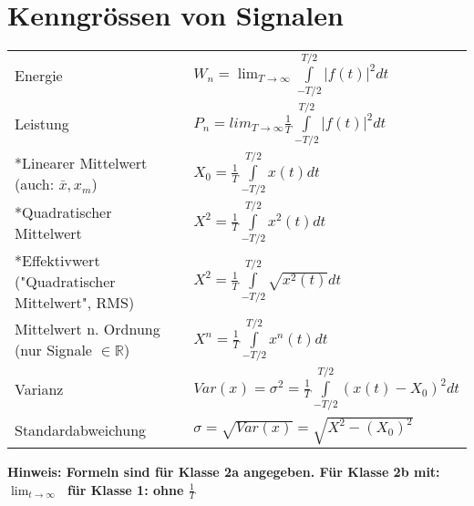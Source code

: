\section{Kenngrössen von Signalen}
\begin{tabular}{p{6cm}p{12cm}}
  Energie                                                            &
  $W_n = \lim_{T \to \infty}  \int \limits _{-T/2} ^{T/2} |f(t)|^2 dt$            \\
  Leistung                                                           &
  $P_n = lim_{T \to \infty} \frac{1}{T} \int \limits _{-T/2} ^{T/2} |f(t)|^2 dt$  \\
  *Linearer Mittelwert
  \newline \tiny(auch: $ \bar{x}, x_m$)                              &
  $X_0 = \frac{1}{T} \int \limits _{-T/2}^{T/2} x(t) dt $                         \\
  *Quadratischer Mittelwert                                          &
  $X^2 = \frac{1}{T} \int \limits _{-T/2}^{T/2} x^2(t) dt$                        \\
  *Effektivwert \newline \tiny{("Quadratischer Mittelwert", RMS)}    &
  $X^2 = \frac{1}{T} \int \limits _{-T/2}^{T/2} \sqrt{x^2(t)} dt $                \\
  Mittelwert n. Ordnung \newline \tiny(nur Signale $\in \mathbb{R}$) &
  $X^n = \frac{1}{T} \int \limits _{-T/2} ^{T/2} x^n(t)dt$                        \\
  Varianz                                                            &
  $Var(x) = \sigma^2 = \frac{1}{T} \int \limits _{-T/2} ^{T/2} (x(t) - X_0)^2 dt$ \\
  Standardabweichung                                                 &
  $\sigma = \sqrt{Var(x)} = \sqrt{X^2 - (X_0)^2}$                                 \\
\end{tabular}
\textbf{\tiny *Hinweis: Formeln sind für Klasse 2a angegeben. \newline
  Für Klasse 2b mit: $\lim_{t \to \infty}\;$ für Klasse 1: ohne $\frac{1}{T}$ }

